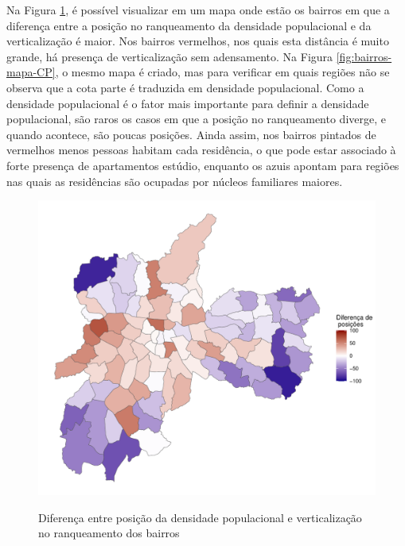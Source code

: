 \begin{apendicesenv}
Na Figura \ref{fig:bairros-mapa}, é possível visualizar em um mapa onde estão os bairros em que a diferença entre a posição no ranqueamento da densidade populacional e da verticalização é maior. Nos bairros vermelhos, nos quais esta distância é muito grande, há presença de verticalização sem adensamento. Na Figura \ref{fig:bairros-mapa-CP}, o mesmo mapa é criado, mas para verificar em quais regiões não se observa que a cota parte é traduzida em densidade populacional. Como a densidade populacional é o fator mais importante para definir a densidade populacional, são raros os casos em que a posição no ranqueamento diverge, e quando acontece, são poucas posições. Ainda assim, nos bairros pintados de vermelhos menos pessoas habitam cada residência, o que pode estar associado à forte presença de apartamentos estúdio, enquanto os azuis apontam para regiões nas quais as residências são ocupadas por núcleos familiares maiores. 

\begin{figure}[!h]
    \centering
    \caption{Diferença entre posição da densidade populacional e verticalização no ranqueamento dos bairros}
    \includegraphics[width = \linewidth]{figuras/bairros-mapa.pdf}
    \label{fig:bairros-mapa}
\end{figure}


\end{apendicesenv}
